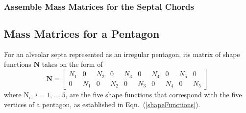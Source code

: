 \subsubsection{Assemble Mass Matrices for the Septal Chords}

\subsection{Mass Matrices for a Pentagon}

For an alveolar septa represented as an irregular pentagon, its matrix of shape functions $\mathbf{N}$ takes on the form of
 \begin{equation}
	\mathbf{N} = 
	\begin{bmatrix}
	N_1 & 0 & N_2 & 0 & N_3 & 0 & N_4 & 0 & N_5 & 0 \\ 0 & N_1 & 0 & N_2 & 0 & N_3 & 0 & N_4 & 0 & N_5 
\end{bmatrix} 
	\label{shape2D}
\end{equation}
where $\mathrm{N}_i$, $i = 1, \ldots, 5$, are the five shape functions that correspond with the five vertices of a pentagon, as established in Eqn.~(\ref{shapeFunctions}).


